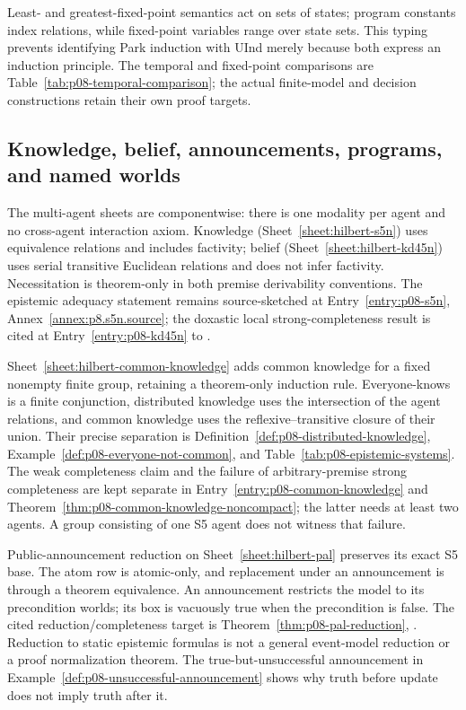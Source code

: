 Least- and greatest-fixed-point semantics act on sets of states; program
constants index relations, while fixed-point variables range over state
sets.  This typing prevents identifying Park induction with UInd merely
because both express an induction principle.  The temporal and fixed-point
comparisons are Table~\ref{tab:p08-temporal-comparison}; the actual
finite-model and decision constructions retain their own proof targets.


\subsection{Knowledge, belief, announcements, programs, and named worlds}

The multi-agent sheets are componentwise: there is one modality per agent
and no cross-agent interaction axiom.  Knowledge
(Sheet~\ref{sheet:hilbert-s5n}) uses equivalence relations and includes
factivity; belief (Sheet~\ref{sheet:hilbert-kd45n}) uses serial transitive
Euclidean relations and does not infer factivity.  Necessitation is
theorem-only in both premise derivability conventions.  The epistemic
adequacy statement remains source-sketched at
Entry~\ref{entry:p08-s5n}, Annex~\ref{annex:p8.s5n.source}; the doxastic
local strong-completeness result is cited at
Entry~\ref{entry:p08-kd45n} to \cite{FaginHalpernMosesVardi1995}.

Sheet~\ref{sheet:hilbert-common-knowledge} adds common knowledge for a fixed
nonempty finite group, retaining a theorem-only induction rule.
Everyone-knows is a finite conjunction, distributed knowledge uses the
intersection of the agent relations, and common knowledge uses the
reflexive--transitive closure of their union.  Their precise separation is
Definition~\ref{def:p08-distributed-knowledge},
Example~\ref{def:p08-everyone-not-common}, and
Table~\ref{tab:p08-epistemic-systems}.  The weak completeness claim and the
failure of arbitrary-premise strong completeness are kept separate in
Entry~\ref{entry:p08-common-knowledge} and
Theorem~\ref{thm:p08-common-knowledge-noncompact}; the latter needs at least
two agents.  A group consisting of one S5 agent does not witness that failure.

Public-announcement reduction on Sheet~\ref{sheet:hilbert-pal} preserves its
exact S5 base.  The atom row is atomic-only, and replacement under an
announcement is through a theorem equivalence.  An announcement restricts
the model to its precondition worlds; its box is vacuously true when the
precondition is false.  The cited reduction/completeness target is
Theorem~\ref{thm:p08-pal-reduction}, \cite{Plaza1989}.  Reduction to static
epistemic formulas is not a general event-model reduction or a proof
normalization theorem.  The true-but-unsuccessful announcement in
Example~\ref{def:p08-unsuccessful-announcement} shows why truth before update
does not imply truth after it.

